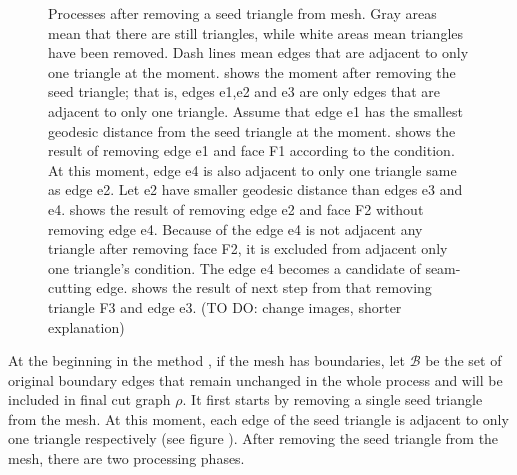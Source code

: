 \documentclass[a4paper,twoside]{article}
\begin{document}
\begin{figure}[t]
	\hspace{0.000\columnwidth}
	\caption{Processes after removing a seed triangle from mesh. Gray areas mean that there are still triangles, while white areas mean triangles have been removed. Dash lines mean edges that are adjacent to only one triangle at the moment.  shows the moment after removing the seed triangle; that is, edges e1,e2 and e3 are only edges that are adjacent to only one triangle. Assume that edge e1 has the smallest geodesic distance from the seed triangle at the moment.  shows the result of removing edge e1 and face F1 according to the condition. At this moment, edge e4 is also adjacent to only one triangle same as edge e2. Let e2 have smaller geodesic distance than edges e3 and e4.   shows the result of removing edge e2 and face F2 without removing edge e4. Because of the edge e4 is not adjacent any triangle after removing face F2, it is excluded from adjacent only one triangle's condition. The edge e4 becomes a candidate of seam-cutting edge.  shows the result of next step from  that removing triangle F3 and edge e3. (TO DO: change images, shorter explanation)}
	\label{fig:OriginalGenusReduceMethodStepByStep}
\end{figure}

At the beginning in the method , if the mesh has boundaries, let $\mathscr{B}$  be the set of original boundary edges that remain unchanged in the whole process and will be included in final cut graph ${\rho}$. It first starts by removing a single seed triangle from the mesh. At this moment, each edge of the seed triangle is adjacent to only one triangle respectively (see figure ).  After removing the seed triangle from the mesh, there are two processing phases.
\end{document}
